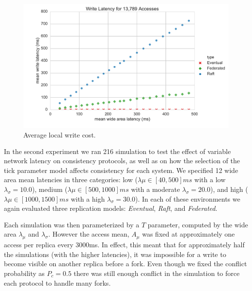 \documentclass[10pt,conference,letterpaper]{IEEEtran}
\begin{document}
\begin{figure}[t]
    \centering
      \includegraphics[width=\linewidth]{figures/latency/write_latency}
      \caption{Average local write cost.}\label{fig:write_latency}
    \endminipage\hfill
\end{figure}

In the second experiment we ran 216 simulation to test the effect of variable network
latency on consistency protocols, as well as on how the selection of the tick parameter
model affects consistency for each system.
We specified 12 wide area mean latencies in three categories: low ($\lambda{\mu} \in
[40,500]ms$ with a low $\lambda_{\sigma}=10.0$), medium ($\lambda{\mu} \in [500,1000]ms$
with a moderate $\lambda_{\sigma}=20.0$), and high ($\lambda{\mu} \in [1000,1500]ms$ with
a high $\lambda_{\sigma}=30.0$).
In each of these environments we again evaluated three replication models:
\textit{Eventual}, \textit{Raft}, and \textit{Federated}.

Each simulation was then parameterized by a $T$ parameter, computed by the
wide area $\lambda_{\mu}$ and $\lambda_{\sigma}$.
However the access mean, $A_{\mu}$ was fixed at approximately one access per replica every
3000ms.
In effect, this meant that for approximately half the simulations (with the higher
latencies), it was impossible for a write to become visible on another replica before a
fork.
Even though we fixed the conflict probability as $P_c=0.5$ there was still enough conflict
in the simulation to force each protocol to handle many forks.
\end{document}
